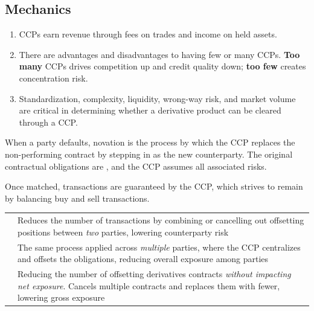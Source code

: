 \subsection*{Mechanics}

\begin{enumerate}[label=\alph*)]
\item CCPs earn revenue through fees on trades and income on held assets.
\item There are advantages and disadvantages to having few or many CCPs.
\textbf{Too many} CCPs drives competition up and credit quality down;
\textbf{too few} creates concentration risk.
\item {} Standardization, complexity, liquidity,
wrong-way risk, and market volume are critical in determining whether a
derivative product can be cleared through a CCP.
\end{enumerate}


\begin{crdefbox}[Novation]
When a party defaults, novation is the process by which the CCP replaces the
non-performing contract by stepping in as the new counterparty. The original
contractual obligations are , and the CCP assumes all
associated risks.
\end{crdefbox}

Once matched, transactions are guaranteed by the CCP, which strives to remain
 by balancing buy and sell transactions.


\begin{center}
\footnotesize
\begin{tabular}{L{3.0cm} L{11.5cm}}
\toprule
{} &  \\
\midrule
{} & Reduces the number of transactions by combining or cancelling
out offsetting positions between \emph{two} parties, lowering counterparty risk \\
 & The same process applied across \emph{multiple}
parties, where the CCP centralizes and offsets the obligations, reducing overall
exposure among parties \\
 & Reducing the number of offsetting derivatives contracts
\emph{without impacting net exposure}. Cancels multiple contracts and replaces
them with fewer, lowering gross exposure \\
\bottomrule
\end{tabular}
\end{center}

